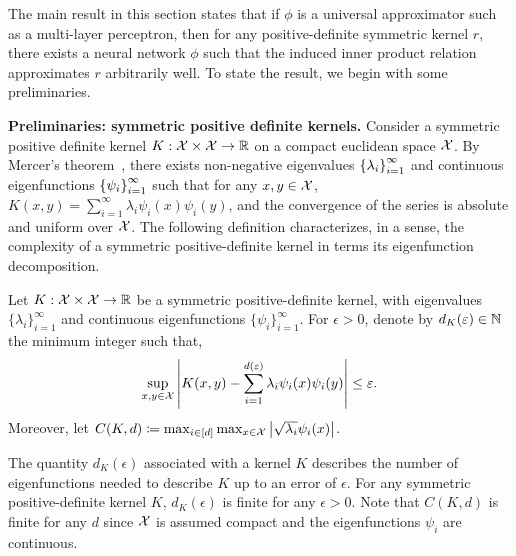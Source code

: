 The main result in this section states that if $\phi$ is a universal approximator such as a multi-layer perceptron, then for any positive-definite symmetric kernel $r$, there exists a neural network $\phi$ such that the induced inner product relation approximates $r$ arbitrarily well. To state the result, we begin with some preliminaries.

\textbf{Preliminaries: symmetric positive definite kernels.} Consider a symmetric positive definite kernel $K: {\mathcal{X}} \times {\mathcal{X}} \to \mathbb{R}$ on a compact euclidean space ${\mathcal{X}}$. By Mercer's theorem~\parencite{mercerFunctionsPositive1909, sunMercerTheorem2005, micchelliUniversalKernels2006}, there exists non-negative eigenvalues $\left\{\lambda_i\right\}_{i=1}^{\infty}$ and continuous eigenfunctions $\left\{\psi_i\right\}_{i=1}^{\infty}$ such that for any $x,y \in {\mathcal{X}}$, $K(x, y) = \sum_{i=1}^\infty \lambda_i \psi_i(x) \psi_i(y)$, and the convergence of the series is absolute and uniform over ${\mathcal{X}}$. The following definition characterizes, in a sense, the complexity of a symmetric positive-definite kernel in terms its eigenfunction decomposition.

\begin{assumption}\label{ass:sym_pd_ker_specturm_decay}
	Let $K: {\mathcal{X}} \times {\mathcal{X}} \to \mathbb{R}$ be a symmetric positive-definite kernel, with eigenvalues $\{\lambda_i\}_{i=1}^{\infty}$ and continuous eigenfunctions $\{\psi_i\}_{i=1}^{\infty}$. For $\epsilon > 0$, denote by $d_K(\varepsilon) \in \mathbb{N}$ the minimum integer such that,
	\begin{equation*}
		\sup_{x, y \in \calX} \abs{K(x, y) - \sum_{i=1}^{d(\epsilon)} \lambda_i \psi_i(x) \psi_i(y)} \leq \epsilon.
	\end{equation*}
	Moreover, let $C(K, d) \coloneq \max_{i \in [d]} \max_{x \in {\mathcal{X}}} \left\lvert\sqrt{\lambda_i} \psi_i(x)\right\rvert$.%
\end{assumption}

The quantity $d_K(\epsilon)$ associated with a kernel $K$ describes the number of eigenfunctions needed to describe $K$ up to an error of $\epsilon$. For any symmetric positive-definite kernel $K$, $d_K(\epsilon)$ is finite for any $\epsilon > 0$. 
Note that $C(K, d)$ is finite for any $d$ since ${\mathcal{X}}$ is assumed compact and the eigenfunctions $\psi_i$ are continuous. %

